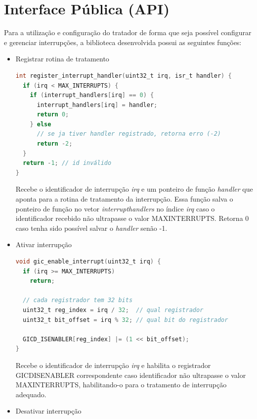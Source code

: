 \section{Interface Pública (API)}
%
%
Para a utilização e configuração do tratador de forma que seja possível configurar e gerenciar interrupções, a biblioteca desenvolvida possui as seguintes funções:
\begin{itemize}
    \item Registrar rotina de tratamento

\begin{lstlisting}[language=C]
int register_interrupt_handler(uint32_t irq, isr_t handler) {
  if (irq < MAX_INTERRUPTS) {
    if (interrupt_handlers[irq] == 0) {
      interrupt_handlers[irq] = handler;
      return 0;
    } else
      // se ja tiver handler registrado, retorna erro (-2)
      return -2;
  }
  return -1; // id inválido
}
\end{lstlisting}

Recebe o identificador de interrupção \emph{irq} e um ponteiro de função \emph{handler} que aponta para a rotina de tratamento da interrupção. Essa função salva o ponteiro de função no vetor \emph{interrupt\textunderscore{}handlers} no índice \emph{irq} caso o identificador recebido não ultrapasse o valor MAX\textunderscore{}INTERRUPTS. Retorna 0 caso tenha sido possível salvar o \emph{handler} senão -1.
    \item Ativar interrupção

\begin{lstlisting}[language=C]
void gic_enable_interrupt(uint32_t irq) {
  if (irq >= MAX_INTERRUPTS)
    return;

  // cada registrador tem 32 bits
  uint32_t reg_index = irq / 32;  // qual registrador
  uint32_t bit_offset = irq % 32; // qual bit do registrador

  GICD_ISENABLER[reg_index] |= (1 << bit_offset);
}
\end{lstlisting}

Recebe o identificador de interrupção \emph{irq} e habilita o registrador GICD\textunderscore{}ISENABLER correspondente caso identificador não ultrapasse o valor MAX\textunderscore{}INTERRUPTS, habilitando-o para o tratamento de interrupção adequado.
    \item Desativar interrupção


\end{itemize}
